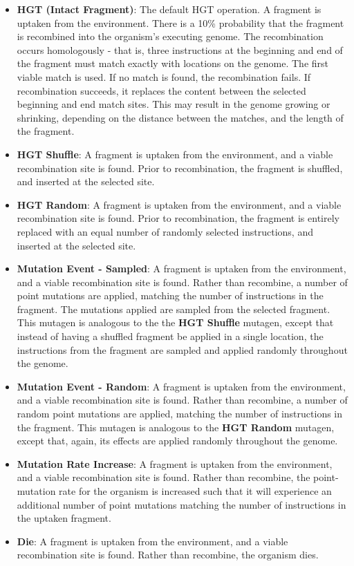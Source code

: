 \documentclass[PhD]{msu-thesis}
\begin{document}
\begin{itemize}
	\item \textbf{HGT (Intact Fragment)}: The default HGT operation. A fragment is uptaken from the environment. There is a 10\% probability that the fragment is recombined into the organism's executing genome. The recombination occurs homologously - that is, three instructions at the beginning and end of the fragment must match exactly with locations on the genome. The first viable match is used. If no match is found, the recombination fails. If recombination succeeds, it replaces the content between the selected beginning and end match sites. This may result in the genome growing or shrinking, depending on the distance between the matches, and the length of the fragment.
	
	\item \textbf{HGT Shuffle}: A fragment is uptaken from the environment, and a viable recombination site is found. Prior to recombination, the fragment is shuffled, and inserted at the selected site.

	\item \textbf{HGT Random}: A fragment is uptaken from the environment, and a viable recombination site is found. Prior to recombination, the fragment is entirely replaced with an equal number of randomly selected instructions, and inserted at the selected site.

	\item \textbf{Mutation Event - Sampled}: A fragment is uptaken from the environment, and a viable recombination site is found. Rather than recombine, a number of point mutations are applied, matching the number of instructions in the fragment. The mutations applied are sampled from the selected fragment. This mutagen is analogous to the the \textbf{HGT Shuffle} mutagen, except that instead of having a shuffled fragment be applied in a single location, the instructions from the fragment are sampled and applied randomly throughout the genome.

	\item \textbf{Mutation Event - Random}: A fragment is uptaken from the environment, and a viable recombination site is found. Rather than recombine, a number of random point mutations are applied, matching the number of instructions in the fragment. This mutagen is analogous to the \textbf{HGT Random} mutagen, except that, again, its effects are applied randomly throughout the genome.

	\item \textbf{Mutation Rate Increase}: A fragment is uptaken from the environment, and a viable recombination site is found. Rather than recombine, the point-mutation rate for the organism is increased such that it will experience an additional number of point mutations matching the number of instructions in the uptaken fragment.

	\item \textbf{Die}: A fragment is uptaken from the environment, and a viable recombination site is found. Rather than recombine, the organism dies.	
\end{itemize}	
\end{document}

